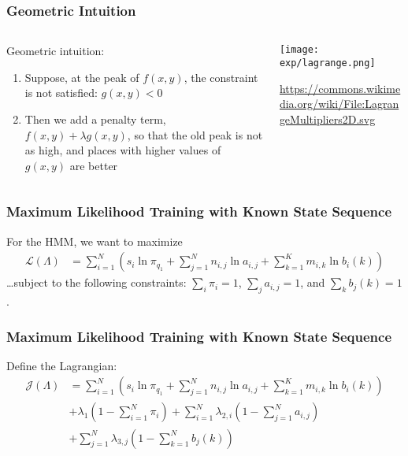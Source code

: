 \documentclass{beamer}
\begin{document}
\begin{frame}
  \frametitle{Geometric Intuition}
  \begin{columns}
    \begin{column}{0.5\textwidth}
      Geometric intuition:
      \begin{enumerate}
      \item Suppose, at the peak of $f(x,y)$, the constraint
        is not satisfied: $g(x,y)< 0$
      \item Then we add a penalty term, $f(x,y)+\lambda g(x,y)$, so that the
        old peak is not as high, and places with higher values of $g(x,y)$
        are better
      \end{enumerate}
    \end{column}
    \begin{column}{0.5\textwidth}
      \centerline{\texttt{[image: exp/lagrange.png]}}

      \url{https://commons.wikimedia.org/wiki/File:LagrangeMultipliers2D.svg}
    \end{column}
  \end{columns}
\end{frame}

\begin{frame}
  \frametitle{Maximum Likelihood Training with Known State Sequence}

  For the HMM, we want to maximize
  \begin{align*}
    {\mathcal L}(\Lambda) 
    &= \sum_{i=1}^N\left(s_i\ln\pi_{q_1}+\sum_{j=1}^N n_{i,j}\ln a_{i,j}+\sum_{k=1}^Km_{i,k}\ln b_i(k)\right)
  \end{align*}
  \ldots subject to the following constraints:
  $\sum_i\pi_i=1$, $\sum_j a_{i,j}=1$, and $\sum_k b_j(k)=1$.
\end{frame}

\begin{frame}
  \frametitle{Maximum Likelihood Training with Known State Sequence}

  Define the Lagrangian:
  \begin{align*}
    {\mathcal J}(\Lambda) 
    &= \sum_{i=1}^N\left(s_i\ln\pi_{q_1}+\sum_{j=1}^N n_{i,j}\ln a_{i,j}+\sum_{k=1}^Km_{i,k}\ln b_i(k)\right)\\
    &+\lambda_1\left(1-\sum_{i=1}^N\pi_i\right)
    +\sum_{i=1}^N\lambda_{2,i}\left(1-\sum_{j=1}^Na_{i,j}\right)\\
    &+\sum_{j=1}^N\lambda_{3,j}\left(1-\sum_{k=1}^Nb_{j}(k)\right)
  \end{align*}
\end{frame}
\end{document}
